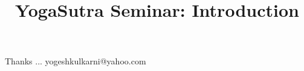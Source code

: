 \documentclass[xcolor=dvipsnames,compress,t,pdf,9pt]{beamer}
\title[\insertframenumber /\inserttotalframenumber]{YogaSutra Seminar: Introduction}
\begin{document}
	\begin{frame}
	\titlepage
	\end{frame}
	
	
	
	\begin{frame}[c]{}
	Thanks ...
	\vspace{5mm}
	yogeshkulkarni@yahoo.com
	\end{frame}
\end{document}
